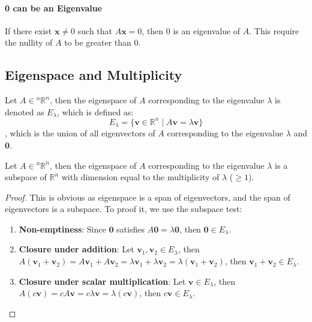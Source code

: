 \documentclass[11pt]{report}
\begin{document}
\paragraph{0 can be an Eigenvalue} If there exist $\textbf{x} \neq 0$ such that $A\textbf{x} = 0$, then 0 is an eigenvalue of $A$. This require the nullity of $A$ to be greater than 0.
\subsection{Eigenspace and Multiplicity}
\begin{definition}[Eigenspace]
    Let $A \in {^n\mathbb{R}^n}$, then the eigenspace of $A$ corresponding to the eigenvalue $\lambda$ is denoted as $E_\lambda$, which is defined as:
    \begin{equation}
        E_\lambda = \{ \textbf{v} \in \mathbb{R}^n \mid A\textbf{v} = \lambda \textbf{v} \}
    \end{equation}
    , which is the union of all eigenvectors of $A$ corresponding to the eigenvalue $\lambda$ and ${\textbf{0}}$.
\end{definition}
\begin{theorem}
    Let $A \in {^n\mathbb{R}^n}$, then the eigenspace of $A$ corresponding to the eigenvalue $\lambda$ is a subspace of $\mathbb{R}^n$ with dimension equal to the multiplicity of $\lambda$ ($\ge 1$).
\end{theorem}
\begin{proof}
    This is obvious as eigenspace is a span of eigenvectors, and the span of eigenvectors is a subspace. To proof it, we use the subspace test:
    \begin{enumerate}
        \item \textbf{Non-emptiness}: Since $\textbf{0}$ satisfies $A\textbf{0} = \lambda \textbf{0}$, then $\textbf{0} \in E_\lambda$.
        \item \textbf{Closure under addition}: Let $\textbf{v}_1, \textbf{v}_2 \in E_\lambda$, then $A(\textbf{v}_1 + \textbf{v}_2) = A\textbf{v}_1 + A\textbf{v}_2 = \lambda \textbf{v}_1 + \lambda \textbf{v}_2 = \lambda(\textbf{v}_1 + \textbf{v}_2)$, then $\textbf{v}_1 + \textbf{v}_2 \in E_\lambda$.
        \item \textbf{Closure under scalar multiplication}: Let $\textbf{v} \in E_\lambda$, then $A(c\textbf{v}) = cA\textbf{v} = c\lambda \textbf{v} = \lambda(c\textbf{v})$, then $c\textbf{v} \in E_\lambda$.
    \end{enumerate}
\end{proof}
\end{document}
